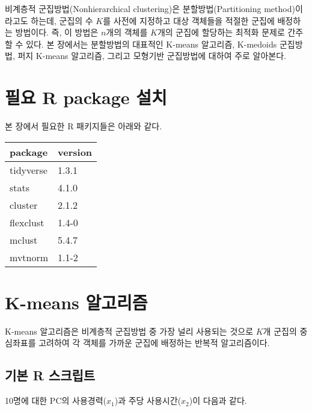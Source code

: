 \documentclass[
]{book}
\begin{document}
비계층적 군집방법(Nonhierarchical clustering)은 분할방법(Partitioning method)이라고도 하는데, 군집의 수 \(K\)를 사전에 지정하고 대상 객체들을 적절한 군집에 배정하는 방법이다. 즉, 이 방법은 \(n\)개의 객체를 \(K\)개의 군집에 할당하는 최적화 문제로 간주할 수 있다. 본 장에서는 분할방법의 대표적인 K-means 알고리즘, K-medoids 군집방법, 퍼지 K-means 알고리즘, 그리고 모형기반 군집방법에 대하여 주로 알아본다.

\hypertarget{nonhierarchical-clustering-packages-install}{%
\section{필요 R package 설치}\label{nonhierarchical-clustering-packages-install}}

본 장에서 필요한 R 패키지들은 아래와 같다.

\begin{tabular}{l|l}
\hline
package & version\\
\hline
tidyverse & 1.3.1\\
\hline
stats & 4.1.0\\
\hline
cluster & 2.1.2\\
\hline
flexclust & 1.4-0\\
\hline
mclust & 5.4.7\\
\hline
mvtnorm & 1.1-2\\
\hline
\end{tabular}

\hypertarget{kmeans}{%
\section{K-means 알고리즘}\label{kmeans}}

K-means 알고리즘은 비계층적 군집방법 중 가장 널리 사용되는 것으로 \(K\)개 군집의 중심좌표를 고려하여 각 객체를 가까운 군집에 배정하는 반복적 알고리즘이다.

\hypertarget{kmeans-basic-script}{%
\subsection{기본 R 스크립트}\label{kmeans-basic-script}}

10명에 대한 PC의 사용경력(\(x_1\))과 주당 사용시간(\(x_2\))이 다음과 같다.
\end{document}
